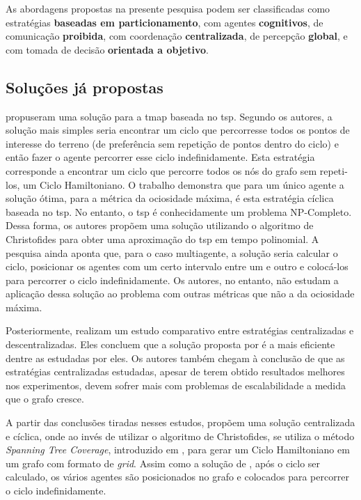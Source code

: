 As abordagens propostas na presente pesquisa podem ser classificadas como 
estratégias \textbf{baseadas em particionamento}, com agentes 
\textbf{cognitivos}, de comunicação \textbf{proibida}, com coordenação 
\textbf{centralizada}, de percepção \textbf{global}, e com tomada de decisão 
\textbf{orientada a objetivo}.

\subsection{Soluções já propostas}

\citep{Chevaleyre:2004:TAM:1018411.1019013} propuseram uma solução para a 
\ac{tmap} baseada no \ac{tsp}. Segundo os autores, a solução mais simples seria 
encontrar um ciclo que percorresse todos os pontos de interesse do terreno 
(de preferência sem repetição de pontos dentro do ciclo) e então fazer o agente 
percorrer esse ciclo indefinidamente. Esta estratégia corresponde a encontrar um 
ciclo que percorre todos os nós do grafo sem repeti-los, um Ciclo Hamiltoniano. 
O trabalho demonstra que para um único agente a solução ótima, para a métrica da 
ociosidade máxima, é esta estratégia cíclica baseada no \ac{tsp}. No entanto, 
o \ac{tsp} é conhecidamente um problema NP-Completo. Dessa forma, os autores 
propõem uma solução utilizando o algoritmo de Christofides 
\citep{christofides1976worst} para obter uma aproximação do \ac{tsp} em tempo 
polinomial. A pesquisa ainda aponta que, para o caso multiagente, a solução 
seria calcular o ciclo, posicionar os agentes com um certo intervalo entre um e 
outro e colocá-los para percorrer o ciclo indefinidamente. Os autores, no 
entanto, não estudam a aplicação dessa solução ao problema com outras métricas 
que não a da ociosidade máxima.

Posteriormente, \citep{Almeida:2004:AAI} realizam um estudo comparativo entre 
estratégias centralizadas e descentralizadas. Eles concluem que a solução 
proposta por \citep{Chevaleyre:2004:TAM:1018411.1019013} é a mais eficiente 
dentre as estudadas por eles. Os autores também chegam à conclusão de que as 
estratégias centralizadas estudadas, apesar de terem obtido resultados melhores 
nos experimentos, devem sofrer mais com problemas de escalabilidade a medida 
que o grafo cresce.

A partir das conclusões tiradas nesses estudos, \citep{4209122} propõem uma 
solução centralizada e cíclica, onde ao invés de utilizar o algoritmo de 
Christofides, se utiliza o método \textit{Spanning Tree Coverage}, introduzido 
em \citep{Gabriely:2001}, para gerar um Ciclo Hamiltoniano em um grafo com 
formato de \textit{grid}. Assim como a solução de 
\citep{Chevaleyre:2004:TAM:1018411.1019013}, após o ciclo ser calculado, os 
vários agentes são posicionados no grafo e colocados para percorrer o ciclo 
indefinidamente.

